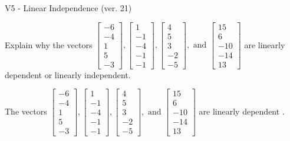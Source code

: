 \begin{exercise}
  \begin{exerciseTitle}V5 - Linear Independence (ver. 21)\end{exerciseTitle}
  \begin{exerciseStatement}
    Explain why the vectors \(\left[\begin{array}{r}
-6 \\
-4 \\
1 \\
5 \\
-3
\end{array}\right] , \left[\begin{array}{r}
1 \\
-1 \\
-4 \\
-1 \\
-1
\end{array}\right] , \left[\begin{array}{r}
4 \\
5 \\
3 \\
-2 \\
-5
\end{array}\right] , \text{ and } \left[\begin{array}{r}
15 \\
6 \\
-10 \\
-14 \\
13
\end{array}\right]\) are linearly dependent or linearly independent.	


  \end{exerciseStatement}
  \begin{exerciseAnswer}
   The vectors \(\left[\begin{array}{r}
-6 \\
-4 \\
1 \\
5 \\
-3
\end{array}\right] , \left[\begin{array}{r}
1 \\
-1 \\
-4 \\
-1 \\
-1
\end{array}\right] , \left[\begin{array}{r}
4 \\
5 \\
3 \\
-2 \\
-5
\end{array}\right] , \text{ and } \left[\begin{array}{r}
15 \\
6 \\
-10 \\
-14 \\
13
\end{array}\right]\) are 
  	 linearly dependent  .
  


  \end{exerciseAnswer}
\end{exercise}